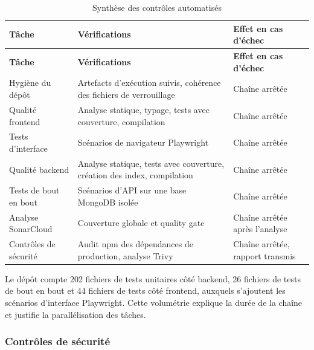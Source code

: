 {\footnotesize
\setlength{\tabcolsep}{4pt}
\begin{longtable}{|>{\raggedright\arraybackslash}p{3.4cm}|>{\raggedright\arraybackslash}p{7.2cm}|>{\raggedright\arraybackslash}p{3.8cm}|}
\caption{Synthèse des contrôles automatisés}
\label{tab:controles-ci}\\
\hline
\textbf{Tâche} & \textbf{Vérifications} & \textbf{Effet en cas d'échec} \\
\hline
\endfirsthead

\hline
\textbf{Tâche} & \textbf{Vérifications} & \textbf{Effet en cas d'échec} \\
\hline
\endhead

Hygiène du dépôt &
Artefacts d'exécution suivis, cohérence des fichiers de verrouillage &
Chaîne arrêtée \\
\hline

Qualité frontend &
Analyse statique, typage, tests avec couverture, compilation &
Chaîne arrêtée \\
\hline

Tests d'interface &
Scénarios de navigateur Playwright &
Chaîne arrêtée \\
\hline

Qualité backend &
Analyse statique, tests avec couverture, création des index, compilation &
Chaîne arrêtée \\
\hline

Tests de bout en bout &
Scénarios d'API sur une base MongoDB isolée &
Chaîne arrêtée \\
\hline

Analyse SonarCloud &
Couverture globale et quality gate &
Chaîne arrêtée après l'analyse \\
\hline

Contrôles de sécurité &
Audit npm des dépendances de production, analyse Trivy &
Chaîne arrêtée, rapport transmis \\
\hline

\end{longtable}}

Le dépôt compte 202 fichiers de tests unitaires côté backend, 26 fichiers de tests de bout en bout et 44 fichiers de tests côté frontend, auxquels s'ajoutent les scénarios d'interface Playwright. Cette volumétrie explique la durée de la chaîne et justifie la parallélisation des tâches.

\subsubsection{Contrôles de sécurité}

